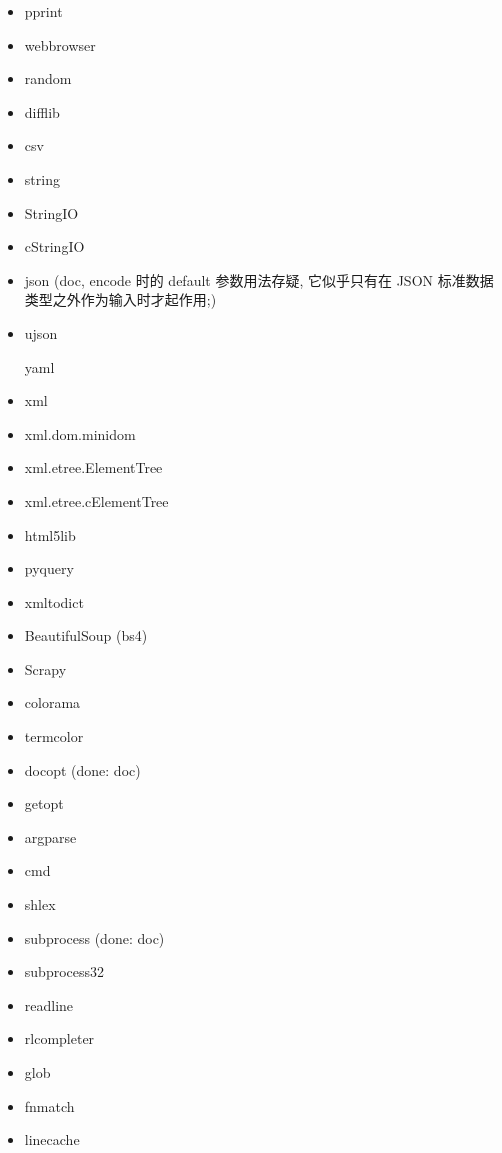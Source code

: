 \documentclass{article}
\begin{document}
\begin{enumerate}
\begin{itemize}
            \item pprint
            \item webbrowser
            \item random
            \item difflib
            \item csv

            \item string
            \item StringIO
            \item cStringIO

            \item json (doc, encode 时的 default 参数用法存疑, 它似乎只有在 JSON 标准数据类型之外作为输入时才起作用;)
            \item ujson

            \itme yaml

            \item xml
            \item xml.dom.minidom
            \item xml.etree.ElementTree
            \item xml.etree.cElementTree
            \item html5lib
            \item pyquery
            \item xmltodict
            \item BeautifulSoup (bs4)
            \item Scrapy

            \item colorama
            \item termcolor
            \item docopt (done: doc)
            \item getopt
            \item argparse
            \item cmd
            \item shlex
            \item subprocess (done: doc)
            \item subprocess32
            \item readline
            \item rlcompleter

            \item glob
            \item fnmatch
            \item linecache


\end{itemize}
\end{enumerate}
\end{document}
